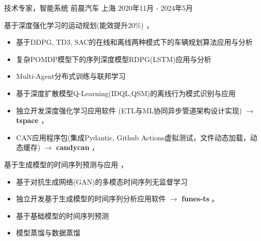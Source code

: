\documentclass[../cv_cn.tex]{subfiles}
\begin{document}


\begin{cventries}

	\cventry
	{技术专家，智能系统} %
	{前晨汽车} %
	{上海} %
	{2020年11月 - 2024年5月} %
	{
		\begin{cvitems} %
			\item 基于深度强化学习的运动规划(能效提升20\%) \supercite{Xin_VEOS_22} \supercite{Xin_Fu_Pan_Simulation_Test_RL_22} \supercite{Pan_Xin_DrvStyle_23}，
			\begin{itemize}
				\item 基于DDPG, TD3, SAC的在线和离线两种模式下的车辆规划算法应用与分析
				\item 复杂POMDP模型下的序列深度模型RDPG(LSTM)应用与分析
				\item Multi-Agent分布式训练与联邦学习
				\item 基于深度扩散模型Q-Learning(IDQL,QSM)的离线行为模式识别与应用
				\item 独立开发深度强化学习应用软件 (ETL与ML协同异步管道架构设计实现) $\rightarrow$ \textbf{tspace} \href{https://binjian.github.io/tspace/}{\faGithub}，
				\item CAN应用程序包(集成Pydantic, Github Actions虚拟测试，文件动态加载，动态缓存) $\rightarrow$ \textbf{candycan} \href{https://binjian.github.io/candycan/}{\faGithub}，
			\end{itemize}
			\item 基于生成模型的时间序列预测与应用 \supercite{Xin_GenAI_23} \supercite{Xin_Chen_NN_TSFeatures_23}，
			\begin{itemize}
				\item 基于对抗生成网络(GAN)的多模态时间序列无监督学习
				\item 独立开发基于生成模型的时间序列分析应用软件 $\rightarrow$ \textbf{funes-ts} \href{https://github.com/binjian/funes-ts/}{\faGithub}。
				\item 基于基础模型的时间序列预测
				\item 模型蒸馏与数据蒸馏
			\end{itemize}

\end{cvitems}}
\end{cventries}
\end{document}
